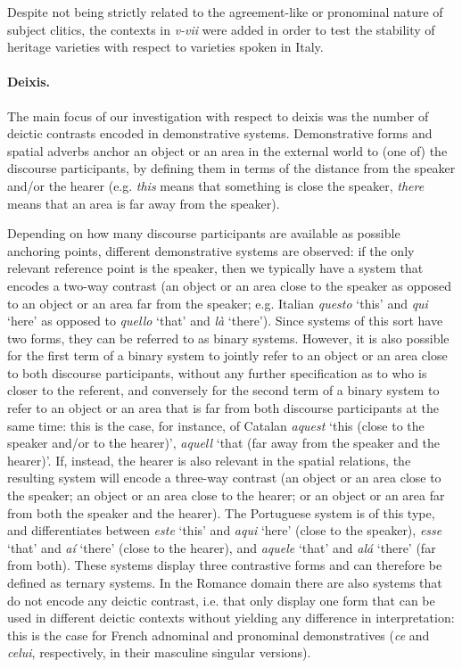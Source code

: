 \documentclass[output=paper,hidelinks]{langscibook}
\begin{document}
Despite not being strictly related to the agreement-like or pronominal nature of subject clitics, the contexts in \textit{v-vii} were added in order to test the stability of heritage varieties with respect to varieties spoken in Italy.

\paragraph{Deixis.}

The main focus of our investigation with respect to deixis was the number of deictic contrasts encoded in demonstrative systems. Demonstrative forms and spatial adverbs anchor an object or an area in the external world to (one of) the discourse participants, by defining them in terms of the distance from the speaker and/or the hearer (e.g. \textit{this} means that something is close the speaker, \textit{there} means that an area is far away from the speaker). 

Depending on how many discourse participants are available as possible anchoring points, different demonstrative systems are observed: if the only relevant reference point is the speaker, then we typically have a system that encodes a two-way contrast (an object or an area close to the speaker as opposed to an object or an area far from the speaker; e.g. Italian \textit{questo} ‘this’ and \textit{qui} ‘here’ as opposed to \textit{quello} ‘that’ and \textit{là} ‘there’). Since systems of this sort have two forms, they can be referred to as binary systems. However, it is also possible for the first term of a binary system to jointly refer to an object or an area close to both discourse participants, without any further specification as to who is closer to the referent, and conversely for the second term of a binary system to refer to an object or an area that is far from both discourse participants at the same time: this is the case, for instance, of Catalan \textit{aquest} ‘this (close to the speaker and/or to the hearer)’, \textit{aquell} ‘that (far away from the speaker and the hearer)’. If, instead, the hearer is also relevant in the spatial relations, the resulting system will encode a three-way contrast (an object or an area close to the speaker; an object or an area close to the hearer; or an object or an area far from both the speaker and the hearer). The Portuguese system is of this type, and differentiates between \textit{este} ‘this’ and \textit{aqui} ‘here’ (close to the speaker), \textit{esse} ‘that’ and \textit{a\'{i}} ‘there’ (close to the hearer), and \textit{aquele} ‘that’ and \textit{al\'{a}} ‘there’ (far from both). These systems display three contrastive forms and can therefore be defined as ternary systems. In the Romance domain there are also systems that do not encode any deictic contrast, i.e. that only display one form that can be used in different deictic contexts without yielding any difference in interpretation: this is the case for French adnominal and pronominal demonstratives (\textit{ce} and \textit{celui}, respectively, in their masculine singular versions).
\end{document}
